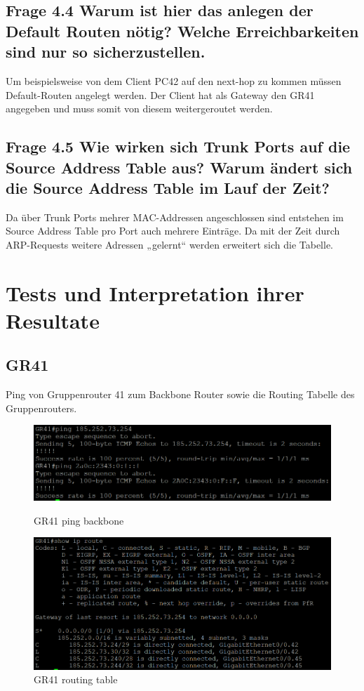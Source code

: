 \documentclass{article}
\begin{document}
\subsection*{Frage 4.4 \normalfont Warum ist hier das anlegen der Default Routen nötig? Welche Erreichbarkeiten sind nur so sicherzustellen.}
Um beispielsweise von dem Client PC42 auf den next-hop zu kommen müssen Default-Routen angelegt werden. Der Client hat als Gateway den GR41 angegeben und muss somit von diesem weitergeroutet werden.


\subsection*{Frage 4.5 \normalfont Wie wirken sich Trunk Ports auf die Source Address Table aus? Warum ändert sich die Source Address Table im Lauf der Zeit?}
Da über Trunk Ports mehrer MAC-Addressen angeschlossen sind entstehen im Source Address Table pro Port auch mehrere Einträge. Da mit der Zeit durch ARP-Requests weitere Adressen „gelernt“ werden erweitert sich die Tabelle.

\pagebreak
\section{Tests und Interpretation ihrer Resultate}

\subsection{GR41}
Ping von Gruppenrouter 41 zum Backbone Router sowie die Routing Tabelle des Gruppenrouters.\\
\begin{figure}[!htp]
  \centering
  \begin{minipage}[b]{0.45\textwidth}
    \includegraphics[width=\textwidth]{Arbeitsergebnisse/GR41/gr41_ping_backbone.png}
    \caption{GR41 ping backbone}
  \end{minipage}
  \hspace{0.8cm}
  \begin{minipage}[b]{0.45\textwidth}
    \includegraphics[width=\textwidth]{Arbeitsergebnisse/GR41/gr41_routing_table.png}
    \caption{GR41 routing table}
  \end{minipage}
\end{figure}
\end{document}
